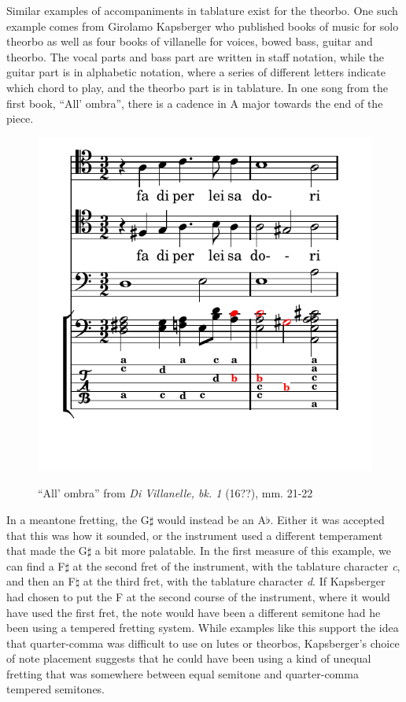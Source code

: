 Similar examples of accompaniments in tablature exist for the theorbo.  One such
example comes from Girolamo Kapsberger who published books of music for solo theorbo
as well as four books of villanelle for voices, bowed bass, guitar and theorbo.  The
vocal parts and bass part are written in staff notation, while the guitar part is in
alphabetic notation, where a series of different letters indicate which chord to play,
and the theorbo part is in tablature.  In one song from the first book,
``All' ombra'', there is a cadence in A major towards the end of the piece.
\begin{figure}[h]
\centering
\includegraphics{examples/kaps_ombria.pdf}
\label{kaps-ombria}
\caption{``All' ombra'' from \textit{Di Villanelle, bk. 1} (16??), mm. 21-22 }
\end{figure}
In a meantone fretting, the G$\sharp$ would instead be an A$\flat$.  Either it was
accepted that this was how it sounded, or the instrument used a different temperament
that made the G$\sharp$ a bit more palatable.  In the first measure of this example,
we can find a F$\sharp$ at the second fret of the instrument, with the tablature
character \textit{c}, and then an F$\natural$ at the third fret, with the tablature
character \textit{d}.  If Kapsberger had chosen to put the F at the second course of the
instrument, where it would have used the first fret, the note would have been a different
semitone had he been using a tempered fretting system.  While examples like this support
the idea that quarter-comma was difficult to use on lutes or theorbos, Kapsberger's
choice of note placement suggests that he could have been using a kind of unequal fretting
that was somewhere between equal semitone and quarter-comma tempered semitones.




